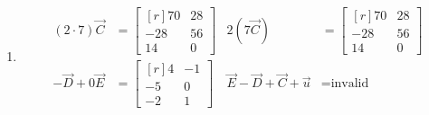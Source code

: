 \begin{enumerate}
    \item  \begin{align}
              (2 \cdot 7)\vec{C}                    & = \begin{bmatrix*}[r]
                                                            70  & 28 \\
                                                            -28 & 56 \\
                                                            14  & 0
                                                        \end{bmatrix*} &
              2 (7\vec{C})                          & = \begin{bmatrix*}[r]
                                                            70  & 28 \\
                                                            -28 & 56 \\
                                                            14  & 0
                                                        \end{bmatrix*} \\
              - \vec{D} + 0\vec{E}                  & = \begin{bmatrix*}[r]
                                                            4  & -1 \\
                                                            -5 & 0  \\
                                                            -2 & 1
                                                        \end{bmatrix*} &
              \vec{E} - \vec{D} + \vec{C} + \vec{u} & = \text{invalid}
          \end{align}


\end{enumerate}
